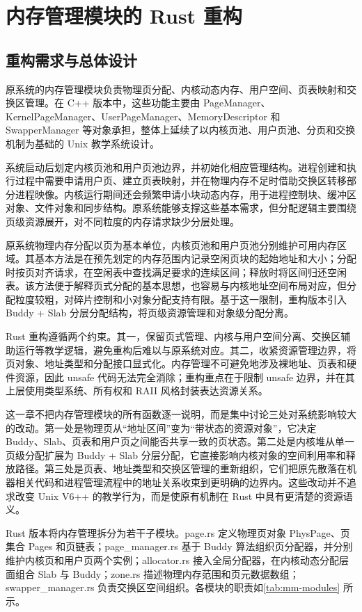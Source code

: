 \chapter{内存管理模块的 Rust 重构}

\section{重构需求与总体设计}

原系统的内存管理模块负责物理页分配、内核动态内存、用户空间、页表映射和交换区管理。在 C++ 版本中，这些功能主要由 PageManager、KernelPageManager、UserPageManager、MemoryDescriptor 和 SwapperManager 等对象承担，整体上延续了以内核页池、用户页池、分页和交换机制为基础的 Unix 教学系统设计。

系统启动后划定内核页池和用户页池边界，并初始化相应管理结构。进程创建和执行过程中需要申请用户页、建立页表映射，并在物理内存不足时借助交换区转移部分进程映像。内核运行期间还会频繁申请小块动态内存，用于进程控制块、缓冲区对象、文件对象和同步结构。原系统能够支撑这些基本需求，但分配逻辑主要围绕页级资源展开，对不同粒度的内存请求缺少分层处理。

原系统物理内存分配以页为基本单位，内核页池和用户页池分别维护可用内存区域。其基本方法是在预先划定的内存范围内记录空闲页块的起始地址和大小；分配时按页对齐请求，在空闲表中查找满足要求的连续区间；释放时将区间归还空闲表。该方法便于解释页式分配的基本思想，也容易与内核地址空间布局对应，但分配粒度较粗，对碎片控制和小对象分配支持有限。基于这一限制，重构版本引入 Buddy + Slab 分层分配结构，将页级资源管理和对象级分配分离。

Rust 重构遵循两个约束。其一，保留页式管理、内核与用户空间分离、交换区辅助运行等教学逻辑，避免重构后难以与原系统对应。其二，收紧资源管理边界，将页对象、地址类型和分配接口显式化。内存管理不可避免地涉及裸地址、页表和硬件资源，因此 unsafe 代码无法完全消除；重构重点在于限制 unsafe 边界，并在其上层使用类型系统、所有权和 RAII 风格封装表达资源关系。

这一章不把内存管理模块的所有函数逐一说明，而是集中讨论三处对系统影响较大的改动。第一处是物理页从“地址区间”变为“带状态的资源对象”，它决定 Buddy、Slab、页表和用户页之间能否共享一致的页状态。第二处是内核堆从单一页级分配扩展为 Buddy + Slab 分层分配，它直接影响内核对象的空间利用率和释放路径。第三处是页表、地址类型和交换区管理的重新组织，它们把原先散落在机器相关代码和进程管理流程中的地址关系收束到更明确的边界内。这些改动并不追求改变 Unix V6++ 的教学行为，而是使原有机制在 Rust 中具有更清楚的资源语义。

Rust 版本将内存管理拆分为若干子模块。page.rs 定义物理页对象 PhysPage、页集合 Pages 和页链表；page\_manager.rs 基于 Buddy 算法组织页分配器，并分别维护内核页和用户页两个实例；allocator.rs 接入全局分配器，在内核动态分配层面组合 Slab 与 Buddy；zone.rs 描述物理内存范围和页元数据数组；swapper\_manager.rs 负责交换区空间组织。各模块的职责如\cref{tab:mm-modules} 所示。

